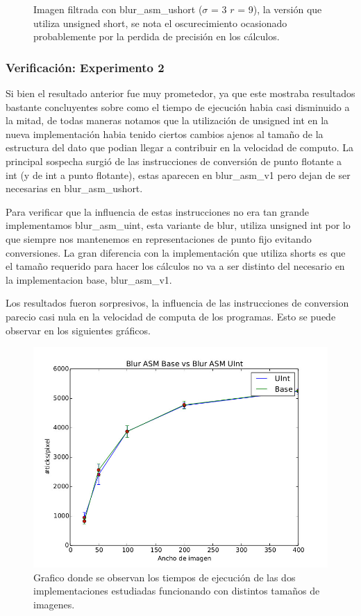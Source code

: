 \begin{figure}[H]
\begin{minipage}{0.48\textwidth}
  \caption{\footnotesize{Imagen filtrada con blur\_asm\_ushort ($\sigma$ = 3 $r$ = 9), la versión que utiliza unsigned short, se nota el oscurecimiento ocasionado probablemente por la perdida de precisión en los cálculos.}}
  \label{fig:tiempo2}
\end{minipage}
\end{figure}


\subsubsection{Verificación: Experimento 2}

Si bien el resultado anterior fue muy prometedor, ya que este mostraba resultados bastante concluyentes sobre como el tiempo de ejecución habia casi disminuido a la mitad, de todas maneras notamos que la utilización de unsigned int en la nueva implementación habia tenido ciertos cambios ajenos al tamaño de la estructura del dato que podian llegar a contribuir en la velocidad de computo. La principal sospecha surgió de las instrucciones de conversión de punto flotante a int (y de int a punto flotante), estas aparecen en blur\_asm\_v1 pero dejan de ser necesarias en blur\_asm\_ushort.

Para verificar que la influencia de estas instrucciones no era tan grande implementamos blur\_asm\_uint, esta variante de blur, utiliza unsigned int por lo que siempre nos mantenemos en representaciones de punto fijo evitando conversiones. La gran diferencia con la implementación que utiliza shorts es que el tamaño requerido para hacer los cálculos no va a ser distinto del necesario en la implementacion base, blur\_asm\_v1. 

Los resultados fueron sorpresivos, la influencia de las instrucciones de conversion parecio casi nula en la velocidad de computa de los programas. Esto se puede observar en los siguientes gráficos.

\begin{figure}[H]
\centering
    \includegraphics[scale=0.5]{imgs/blur_uint.jpg}
  \caption{\footnotesize{Grafico donde se observan los tiempos de ejecución de las dos implementaciones estudiadas funcionando con distintos tamaños de imagenes.}}
  \label{fig:tiempo1}
\end{figure}

